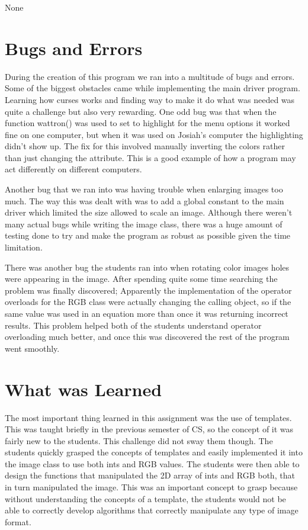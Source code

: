 \documentclass[pdftex, 11pt]{article}
\begin{document}
\begin{description}
\begin{description}
				None

		\end{description}


\section{Bugs and Errors}

	During the creation of this program we ran into a multitude of bugs and errors.  Some of the biggest obstacles came
while implementing the main driver program.  Learning how curses works and finding way to make it do what was needed was
quite a challenge but also very rewarding.  One odd bug was that when the function wattron() was used to set to
highlight for the menu options it worked fine on one computer, but when it was used on Josiah's computer the
highlighting didn't show up.  The fix for this involved manually inverting the colors rather than just changing the
attribute.  This is a good example of how a program may act differently on different computers.

	Another bug that we ran into was having trouble when enlarging images too much.  The way this was dealt with was to add a
global constant to the main driver which limited the size allowed to scale an image.  Although there weren't many actual
bugs while writing the image class, there was a huge amount of testing done to try and make the program as robust as
possible given the time limitation.

	There was another bug the students ran into when rotating color images holes were appearing in the image.  After
spending quite some time searching the problem was finally discovered;  Apparently the implementation of the operator
overloads for the RGB class were actually changing the calling object, so if the same value was used in an equation more
than once it was returning incorrect results.  This problem helped both of the students understand operator overloading
much better, and once this was discovered the rest of the program went smoothly.

\section{What was Learned}

	The most important thing learned in this assignment was the use of templates. This was taught briefly in the previous
semester of CS, so the concept of it was fairly new to the students. This challenge did not sway them though. The
students quickly grasped the concepts of templates and easily implemented it into the image class to use both ints and
RGB values. The students were then able to design the functions that manipulated the 2D array of ints and RGB both, that
in turn manipulated the image. This was an important concept to grasp because without understanding the concepts of a
template, the students would not be able to correctly develop algorithms that correctly manipulate any type of image
format.


\end{description}
\end{document}
